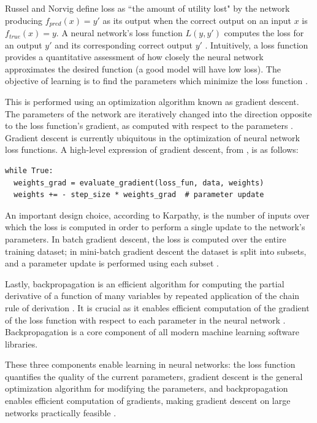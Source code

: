 \documentclass[12pt, titlepage]{report}
\theoremstyle{definition}
\begin{document}
Russel and Norvig define loss as ``the amount of utility lost" by the network producing $f_{pred}(x) = y'$ as its output when the correct output on an input $x$ is $f_{true}(x) = y$. A neural network's loss function $L(y, y')$ computes the loss for an output $y'$ and its corresponding correct output $y'$ \cite{russel2009artificial}. Intuitively, a loss function provides a quantitative assessment of how closely the neural network approximates the desired function (a good model will have low loss). The objective of learning is to find the parameters which minimize the loss function \cite[Linear classification: Support Vector Machine, Softmax]{karpathy2017cs231n}.

This is performed using an optimization algorithm known as gradient descent. The parameters of the network are iteratively changed into the direction opposite to the loss function's gradient, as computed with respect to the parameters \cite[Optimization: Stochastic Gradient Descent]{karpathy2017cs231n}. Gradient descent is currently ubiquitous in the optimization of neural network loss functions. A high-level expression of gradient descent, from \cite{karpathy2017cs231n}, is as follows:

\begin{verbatim}
while True:
  weights_grad = evaluate_gradient(loss_fun, data, weights)
  weights += - step_size * weights_grad  # parameter update
\end{verbatim}

An important design choice, according to Karpathy, is the number of inputs over which the loss is computed in order to perform a single update to the network's parameters. In batch gradient descent, the loss is computed over the entire training dataset; in mini-batch gradient descent the dataset is split into subsets, and a parameter update is performed using each subset \cite[Optimization: Stochastic Gradient Descent]{karpathy2017cs231n}. 

Lastly, backpropagation is an efficient algorithm for computing the partial derivative of a function of many variables by repeated application of the chain rule of derivation \cite[Backpropagation, Intuitions]{karpathy2017cs231n}. It is crucial as it enables efficient computation of the gradient of the loss function with respect to each parameter in the neural network \cite[Backpropagation, Intuitions]{karpathy2017cs231n}. Backpropagation is a core component of all modern machine learning software libraries.

These three components enable learning in neural networks: the loss function quantifies the quality of the current parameters, gradient descent is the general optimization algorithm for modifying the parameters, and backpropagation enables efficient computation of gradients, making gradient descent on large networks practically feasible \cite[Optimization: Stochastic Gradient Descent]{karpathy2017cs231n}.
\end{document}
